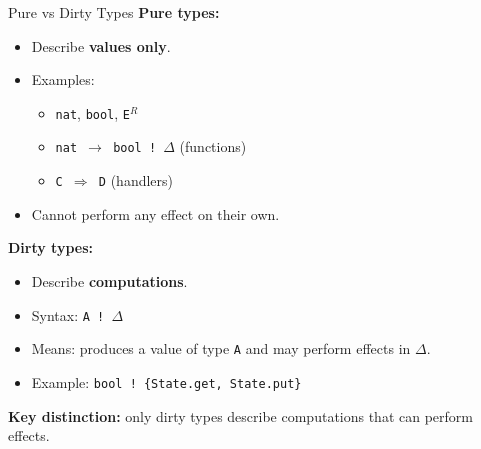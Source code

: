 \begin{frame}{Pure vs Dirty Types}
\textbf{Pure types:}
\begin{itemize}
  \item Describe \textbf{values only}.
  \item Examples:
    \begin{itemize}
      \item \texttt{nat}, \texttt{bool}, \texttt{E$^R$}
      \item \texttt{nat $\rightarrow$ bool ! $\Delta$} (functions)
      \item \texttt{C $\Rightarrow$ D} (handlers)
    \end{itemize}
  \item Cannot perform any effect on their own.
\end{itemize}

\vspace{1em}
\textbf{Dirty types:}
\begin{itemize}
  \item Describe \textbf{computations}.
  \item Syntax: \texttt{A ! $\Delta$}
  \item Means: produces a value of type \texttt{A} and may perform effects in $\Delta$.
  \item Example: \texttt{bool ! \{State.get, State.put\}}
\end{itemize}

\vspace{1em}
\textbf{Key distinction:} only dirty types describe computations that can perform effects.
\end{frame}

